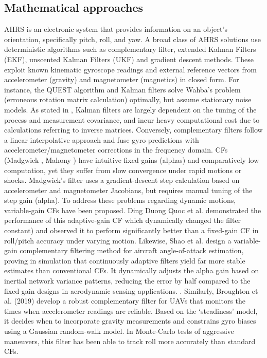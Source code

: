 \documentclass{iutbscthesis}
\begin{document}
\subsection{Mathematical approaches}
AHRS is an electronic system that provides information on an object's orientation, specifically pitch, roll, and yaw. A broad class of AHRS solutions use deterministic algorithms such as complementary filter\cite{compfilter}, extended Kalman Filters (EKF)\cite{EKF}, unscented Kalman Filters (UKF)\cite{UKF} and gradient descent \cite{madgwick2011estimation} methods. These exploit known kinematic gyroscope readings and external reference vectors from accelerometer (gravity) and magnetometer (magnetics) in closed form. For instance, the QUEST algorithm\cite{quest}\cite{reQUEST} and Kalman filters solve Wahba's problem (erroneous rotation matrix calculation)\cite{wahba} optimally, but assume stationary noise models. As stated in \cite{vertzberger2022adaptive}, Kalman filters are largely dependent on the tuning of the process and measurement covariance, and incur heavy computational cost due to calculations referring to inverse matrices. Conversely, complementary filters follow
a linear interpolative approach and fuse gyro predictions with accelerometer/magnetometer corrections in the frequency domain. CFs (Madgwick \cite{madgwick2011estimation}, Mahony \cite{mahony2008nonlinear}) have intuitive fixed gains (alphas) and comparatively low computation, yet they suffer from slow convergence under rapid motions or shocks. Madgwick's filter \cite{madgwick2011estimation} uses a gradient-descent step calculation based on accelerometer and magnetometer Jacobians, but requires manual tuning of the step gain (alpha). To address these problems regarding dynamic motions, variable-gain CFs have been proposed. Ding Duong Quoc et al. demonstrated the performance of this adaptive-gain CF \cite{dung2015filtergain} which dynamically changed the filter constant) and observed it to perform significantly better than a fixed-gain CF in roll/pitch accuracy under varying motion. Likewise, Shao et al. design a variable-gain complementary filtering method for aircraft angle-of-attack estimation, proving in simulation that continuously adaptive filters yield far more stable estimates than conventional CFs. It dynamically adjusts the alpha gain based on inertial network variance patterns, reducing the error by half compared to the fixed-gain designs in aerodynamic sensing applications. \cite{shao2023variablegainflushsesnsing}. Similarly, Broughton et al. (2019) develop a robust complementary filter for UAVs that monitors the times when accelerometer readings are reliable. Based on the `steadiness' model, it decides when to incorporate gravity measurements and constrains gyro biases using a Gaussian random-walk model. In Monte-Carlo tests of aggressive maneuvers, this filter has been able to track roll more accurately than standard CFs. \cite{CEAS-GNC-2019-036}
\end{document}
